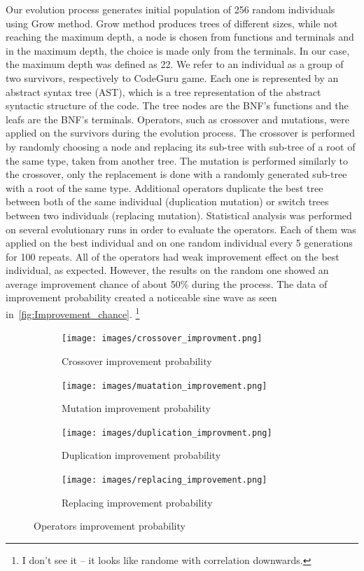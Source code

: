 \documentclass[dvipsnames,format=sigconf,anonymous=true,review=true]{acmart}
\begin{document}
Our evolution process generates initial population of 256 random individuals using Grow method. Grow method produces trees of different sizes, while not reaching the maximum depth, a node is chosen from functions and terminals and in the maximum depth, the choice is made only from the terminals. In our case, the maximum depth was defined as 22. We refer to an individual as a group of two survivors, respectively to CodeGuru game. Each one is represented by an abstract syntax tree (AST), which is a tree representation of the abstract syntactic structure of the code. The tree nodes are the BNF’s functions and the leafs are the BNF’s terminals. 
Operators, such as crossover and mutations, were applied on the survivors during the evolution process.
The crossover is performed by randomly choosing a node and replacing its sub-tree with sub-tree of a root of the same type, taken from another tree.
The mutation is performed similarly to the crossover, only the replacement is done with a randomly generated sub-tree with a root of the same type.
Additional operators duplicate the best tree between both of the same individual (duplication mutation) or switch trees between two individuals (replacing mutation).
Statistical analysis was performed on several evolutionary runs in order to evaluate the operators. Each of them was applied on the best individual and on one random individual every 5 generations for 100 repeats. All of the operators had weak improvement effect on the best individual, as expected. However, the results on the random one showed an average improvement chance of about 50\% during the process.
The data of improvement probability created a noticeable sine wave as seen in~\autoref{fig:Improvement_chance}.
\footnote{I don't see it -- it looks like randome with correlation downwards.}
\begin{figure}
  \centering
  \begin{subfigure}{0.48\textwidth}
    \texttt{[image: images/crossover\_improvment.png]}
    \caption{Crossover improvement probability}
    \label{fig:cross}
  \end{subfigure}
  \hfill
  \begin{subfigure}{0.48\textwidth}
    \texttt{[image: images/muatation\_improvement.png]}
    \caption{Mutation improvement probability}
    \label{fig:mut}
  \end{subfigure}
  \begin{subfigure}{0.48\textwidth}
    \texttt{[image: images/duplication\_improvment.png]}
    \caption{Duplication improvement probability}
    \label{fig:dup}
  \end{subfigure}
  \hfill
  \begin{subfigure}{0.48\textwidth}
    \texttt{[image: images/replacing\_improvement.png]}
    \caption{Replacing improvement probability}
    \label{fig:rep}
  \end{subfigure}
  \caption{Operators improvement probability}
  \label{fig:Improvement_chance}
\end{figure}
\end{document}
